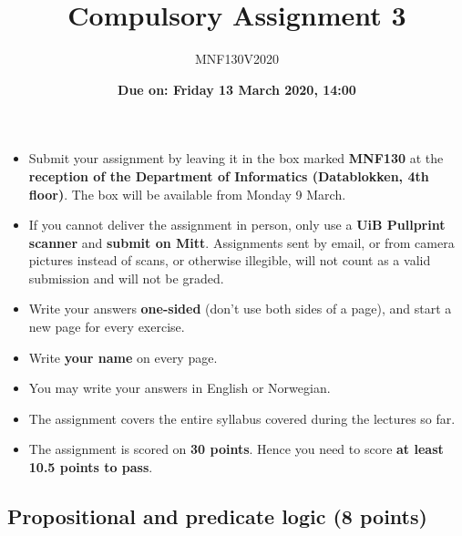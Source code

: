\documentclass[12pt]{article}
\title{\huge Compulsory Assignment 3}
\author{\LARGE MNF130V2020\\}
\date{\Large\textbf{Due on: Friday 13 March 2020, 14:00}}
\begin{document}
\maketitle

\bigskip

  \vspace*{15mm}

  {\large
  \begin{minipage}{\linewidth}
    \begin{itemize}
    \item Submit your assignment by leaving it in the box marked
      \textbf{MNF130} at the \textbf{reception of the Department of
        Informatics (Datablokken, 4th floor)}. The box will be
      available from Monday 9 March.  \smallskip
    \item If you cannot deliver the assignment in person, only use a
      \textbf{UiB Pullprint scanner} and \textbf{submit on
        Mitt}. Assignments sent by email, or from camera pictures
      instead of scans, or otherwise illegible, will not count as a
      valid submission and will not be graded.
      \smallskip
    \item Write your answers \textbf{one-sided} (don't use both sides
      of a page), and start a new page for every exercise.
      \smallskip
    \item Write \textbf{your name} on every page.
      \smallskip
    \item You may write your answers in English or Norwegian.
      \smallskip
    \item The assignment covers the entire syllabus covered during the
      lectures so far.
      \smallskip
    \item The assignment is scored on \textbf{30 points}. Hence you
      need to score \textbf{at least 10.5 points to pass}.
  \end{itemize}
  \end{minipage}
  }

\bigskip

\bigskip

\newpage

\subsection{Propositional and predicate logic (8 points)}
\end{document}
